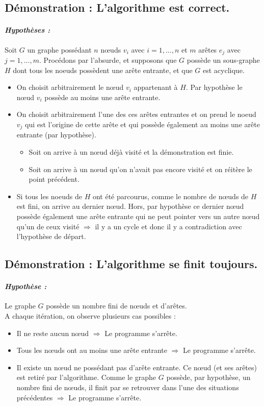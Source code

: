 \subsection*{Démonstration : L'algorithme est correct.}
\paragraph{\textit{Hypothèses :}}Soit $G$ un graphe possédant $n$ nœuds $v_i$ avec $i=1,...,n$ et $m$ arêtes $e_j$ avec $j=1,...,m$. Procédons par l'absurde, et supposons que $G$ possède un sous-graphe $H$ dont tous les noeuds possèdent une arête entrante, et que $G$ est acyclique.\\
\begin{itemize}
\item On choisit arbitrairement le nœud $v_i$ appartenant à $H$. Par hypothèse le nœud $v_i$ possède au moins une arête entrante. 
\item On choisit arbitrairement l'une des ces arêtes entrantes et on prend le noeud $v_j$ qui est l'origine de cette arête et qui possède également au moins une arête entrante (par hypothèse).
\begin{itemize}
\item Soit on arrive à un nœud déjà visité et la démonstration est finie.
\item Soit on arrive à un nœud qu'on n'avait pas encore visité et on réitère le point précédent.
\end{itemize}
\item Si tous les noeuds de $H$ ont été parcourus, comme le nombre de nœuds de $H$ est fini, on arrive au dernier nœud. Hors, par hypothèse ce dernier nœud possède également une arête entrante qui ne peut pointer vers un autre nœud qu'un de ceux visité $\Rightarrow$ il y a un cycle et donc il y a contradiction avec l'hypothèse de départ.
\end{itemize}
\subsection*{Démonstration : L'algorithme se finit toujours.}
\paragraph{\textit{Hypothèse :}}Le graphe $G$ possède un nombre fini de nœuds et d'arêtes.\\
A chaque itération, on observe plusieurs cas possibles : 
\begin{itemize}
\item Il ne reste aucun nœud $\Rightarrow$ Le programme s'arrête.
\item Tous les nœuds ont au moins une arête entrante $\Rightarrow$ Le programme s'arrête.
\item Il existe un nœud ne possédant pas d'arête entrante. Ce nœud (et ses arêtes) est retiré par l'algorithme. Comme le graphe $G$ possède, par hypothèse, un nombre fini de nœuds, il finit par se retrouver dans l'une des situations précédentes $\Rightarrow$ Le programme s'arrête.
\end{itemize} 